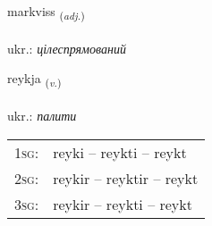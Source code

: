 \documentclass[frontgrid, backgrid]{flacards}\usepackage[]{graphicx}\usepackage[]{xcolor}
\begin{document}
\renewcommand{\flhead}{\vskip5pt \fboxsep=0pt {\small\bfseries\footnotesize Lýsingarorð | прикметник}}
\renewcommand{\fcfoot}{\vskip5pt \fboxsep=0pt \hspace{2pt}{\small\bfseries\footnotesize 2K}}

\renewcommand{\blhead}{\vskip5pt {\small\bfseries\footnotesize Lýsingarorð | прикметник }}
\renewcommand{\bcfoot}{\vskip5pt \hspace{2pt}{\small\bfseries\footnotesize 2K}}


{markviss \small{\textsubscript{(\textit{adj.})}} \\[1ex] %
 \\
ukr.: \emph{цілеспрямований} \\  [2ex]
\renewcommand*{\arraystretch}{0.8}
}

\renewcommand{\flhead}{\vskip5pt \fboxsep=0pt {\small\bfseries\footnotesize Sagnorð | дієслово}}
\renewcommand{\fcfoot}{\vskip5pt \fboxsep=0pt \hspace{2pt}{\small\bfseries\footnotesize 2K}}

\renewcommand{\blhead}{\vskip5pt {\small\bfseries\footnotesize Sagnorð | дієслово }}
\renewcommand{\bcfoot}{\vskip5pt \hspace{2pt}{\small\bfseries\footnotesize 2K}}


{reykja \small{\textsubscript{(\textit{v.})}} \\[1ex] %
\textphonetic{[reiːca]} \\
ukr.: \emph{палити} \\  [2ex]
\renewcommand*{\arraystretch}{0.8}
\begin{tabular}{p{1cm}l}
\textsc{1sg}: & reyki -- reykti -- reykt \\ 
\textsc{2sg}: & reykir -- reyktir -- reykt \\ 
\textsc{3sg}: & reykir -- reykti -- reykt \\ 
\end{tabular}
}
\end{document}
